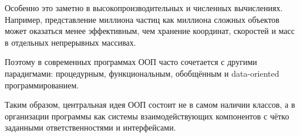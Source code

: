 Особенно это заметно в высокопроизводительных и численных вычислениях. Например, представление миллиона частиц как миллиона сложных объектов может оказаться менее эффективным, чем хранение координат, скоростей и масс в отдельных непрерывных массивах.

Поэтому в современных программах ООП часто сочетается с другими парадигмами: процедурным, функциональным, обобщённым и data-oriented программированием.

Таким образом, центральная идея ООП состоит не в самом наличии классов, а в организации программы как системы взаимодействующих компонентов с чётко заданными ответственностями и интерфейсами.

\newpage
